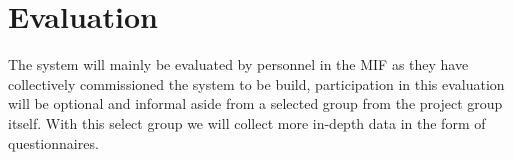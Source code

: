 \section{Evaluation}
The system will mainly be evaluated by personnel in the MIF as they have collectively commissioned the system to be build, participation in this evaluation will be optional and informal aside from a selected group from the project group itself. With this select group we will collect more in-depth data in the form of questionnaires. \\